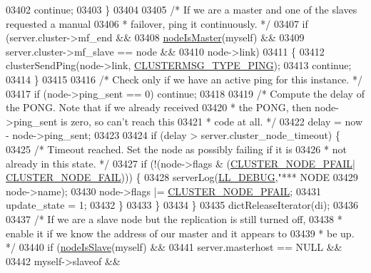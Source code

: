 \begin{DoxyCode}
{{{{{{{{{{{{{{{{{{{{{{{{{{{{{{{{{{{{{{{{{{{{{{{{{{{{{{{{{{{{03402             \textcolor{keywordflow}{continue};
03403         \}
03404 
03405         \textcolor{comment}{/* If we are a master and one of the slaves requested a manual}
03406 \textcolor{comment}{         * failover, ping it continuously. */}
03407         \textcolor{keywordflow}{if} (server.cluster->mf\_end &&
03408             \hyperlink{cluster_8h_a2d8e84269474d8750565fb3fb67aa436}{nodeIsMaster}(myself) &&
03409             server.cluster->mf\_slave == node &&
03410             node->link)
03411         \{
03412             clusterSendPing(node->link, \hyperlink{cluster_8h_aeb8a936505e22f64e5039523a3c96d4c}{CLUSTERMSG\_TYPE\_PING});
03413             \textcolor{keywordflow}{continue};
03414         \}
03415 
03416         \textcolor{comment}{/* Check only if we have an active ping for this instance. */}
03417         \textcolor{keywordflow}{if} (node->ping\_sent == 0) \textcolor{keywordflow}{continue};
03418 
03419         \textcolor{comment}{/* Compute the delay of the PONG. Note that if we already received}
03420 \textcolor{comment}{         * the PONG, then node->ping\_sent is zero, so can't reach this}
03421 \textcolor{comment}{         * code at all. */}
03422         delay = now - node->ping\_sent;
03423 
03424         \textcolor{keywordflow}{if} (delay > server.cluster\_node\_timeout) \{
03425             \textcolor{comment}{/* Timeout reached. Set the node as possibly failing if it is}
03426 \textcolor{comment}{             * not already in this state. */}
03427             \textcolor{keywordflow}{if} (!(node->flags & (\hyperlink{cluster_8h_a5306c1ae8988b8be0a1a02bd9162dfa1}{CLUSTER\_NODE\_PFAIL}|
      \hyperlink{cluster_8h_ad211e85c7baf8a5a59acd747e4e9005a}{CLUSTER\_NODE\_FAIL}))) \{
03428                 serverLog(\hyperlink{server_8h_abcaffe365dee628fcf9fc90c69d534a1}{LL\_DEBUG},\textcolor{stringliteral}{"*** NODE %
03429                     node->name);
03430                 node->flags |= \hyperlink{cluster_8h_a5306c1ae8988b8be0a1a02bd9162dfa1}{CLUSTER\_NODE\_PFAIL};
03431                 update\_state = 1;
03432             \}
03433         \}
03434     \}
03435     dictReleaseIterator(di);
03436 
03437     \textcolor{comment}{/* If we are a slave node but the replication is still turned off,}
03438 \textcolor{comment}{     * enable it if we know the address of our master and it appears to}
03439 \textcolor{comment}{     * be up. */}
03440     \textcolor{keywordflow}{if} (\hyperlink{cluster_8h_a3c99881f6892130c902b42b1f84a0e11}{nodeIsSlave}(myself) &&
03441         server.masterhost == NULL &&
03442         myself->slaveof &&
}}}}}}}}}}}}}}}}}}}}}}}}}}}}}}}}}}}}}}}}}}}}}}}}}}}}}}}}}}}}}
\end{DoxyCode}
